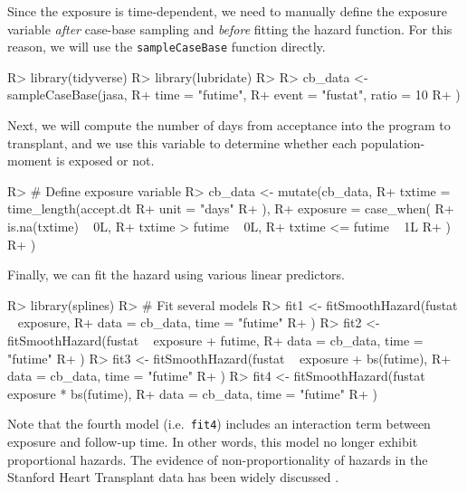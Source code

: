 \documentclass[
]{jss}
\begin{document}
Since the exposure is time-dependent, we need to manually define the
exposure variable \emph{after} case-base sampling and \emph{before}
fitting the hazard function. For this reason, we will use the
\texttt{sampleCaseBase} function directly.

\begin{CodeChunk}

\begin{CodeInput}
R> library(tidyverse)
R> library(lubridate)
R> 
R> cb_data <- sampleCaseBase(jasa,
R+   time = "futime",
R+   event = "fustat", ratio = 10
R+ )
\end{CodeInput}
\end{CodeChunk}

Next, we will compute the number of days from acceptance into the
program to transplant, and we use this variable to determine whether
each population-moment is exposed or not.

\begin{CodeChunk}

\begin{CodeInput}
R> # Define exposure variable
R> cb_data <- mutate(cb_data,
R+   txtime = time_length(accept.dt %
R+                        unit = "days"
R+   ),
R+   exposure = case_when(
R+     is.na(txtime) ~ 0L,
R+     txtime > futime ~ 0L,
R+     txtime <= futime ~ 1L
R+   )
R+ )
\end{CodeInput}
\end{CodeChunk}

Finally, we can fit the hazard using various linear predictors.

\begin{CodeChunk}

\begin{CodeInput}
R> library(splines)
R> # Fit several models
R> fit1 <- fitSmoothHazard(fustat ~ exposure,
R+   data = cb_data, time = "futime"
R+ )
R> fit2 <- fitSmoothHazard(fustat ~ exposure + futime,
R+   data = cb_data, time = "futime"
R+ )
R> fit3 <- fitSmoothHazard(fustat ~ exposure + bs(futime),
R+   data = cb_data, time = "futime"
R+ )
R> fit4 <- fitSmoothHazard(fustat ~ exposure * bs(futime),
R+   data = cb_data, time = "futime"
R+ )
\end{CodeInput}
\end{CodeChunk}

Note that the fourth model (i.e.~\texttt{fit4}) includes an interaction
term between exposure and follow-up time. In other words, this model no
longer exhibit proportional hazards. The evidence of non-proportionality
of hazards in the Stanford Heart Transplant data has been widely
discussed \citep{arjas1988graphical}.
\end{document}
